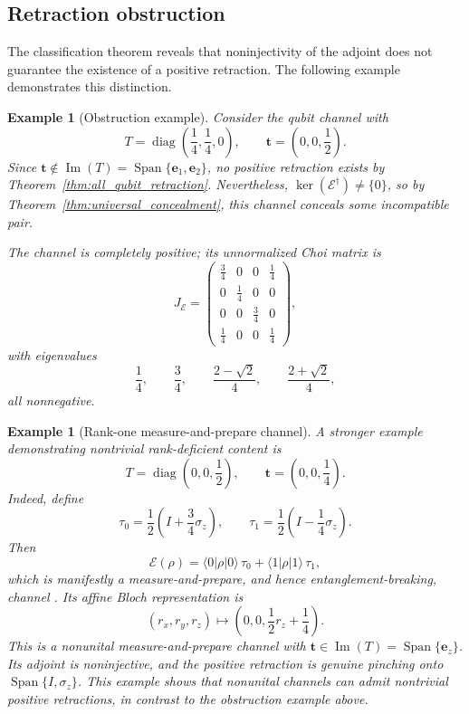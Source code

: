 \documentclass[
aps,pra,twocolumn,10pt,
superscriptaddress,longbibliography,floatfix
]{revtex4-2}
\DeclareMathOperator{\diag}{diag}
\DeclareMathOperator{\Span}{Span}
\DeclareMathOperator{\im}{Im}
\newtheorem{example}[theorem]{Example}
\begin{document}
\subsection{Retraction obstruction}

The classification theorem reveals that noninjectivity of the adjoint does not guarantee the existence of a positive retraction. The following example demonstrates this distinction.

\begin{example}[Obstruction example]
Consider the qubit channel with
\[
T=\diag\!\left(\frac14,\frac14,0\right),\qquad \mathbf t=\left(0,0,\frac12\right).
\]
Since $\mathbf t\notin\im(T)=\Span\{\mathbf e_1,\mathbf e_2\}$, no positive retraction exists by Theorem~\ref{thm:all_qubit_retraction}. Nevertheless, $\ker(\mathcal E^\dagger)\neq\{0\}$, so by Theorem~\ref{thm:universal_concealment}, this channel conceals some incompatible pair.

The channel is completely positive; its unnormalized Choi matrix is
\[
J_{\mathcal E}
=
\begin{pmatrix}
\frac34&0&0&\frac14\\
0&\frac14&0&0\\
0&0&\frac34&0\\
\frac14&0&0&\frac14
\end{pmatrix},
\]
with eigenvalues
\[
\frac14,\qquad
\frac34,\qquad
\frac{2-\sqrt2}{4},\qquad
\frac{2+\sqrt2}{4},
\]
all nonnegative.
\end{example}

\begin{example}[Rank-one measure-and-prepare channel]
A stronger example demonstrating nontrivial rank-deficient content is
\[
T=\diag\left(0,0,\frac12\right),\qquad \mathbf t=\left(0,0,\frac14\right).
\]
Indeed, define
\[
\tau_0=\frac12\left(I+\frac34\sigma_z\right),
\qquad
\tau_1=\frac12\left(I-\frac14\sigma_z\right).
\]
Then
\[
\mathcal E(\rho)
=
\langle0|\rho|0\rangle\,\tau_0
+
\langle1|\rho|1\rangle\,\tau_1,
\]
which is manifestly a measure-and-prepare, and hence entanglement-breaking, channel \cite{Horodecki2003}. Its affine Bloch representation is
\[
(r_x,r_y,r_z)
\longmapsto
\left(0,0,\frac12r_z+\frac14\right).
\]
This is a nonunital measure-and-prepare channel with $\mathbf t\in\im(T)=\Span\{\mathbf e_z\}$. Its adjoint is noninjective, and the positive retraction is genuine pinching onto $\Span\{I,\sigma_z\}$. This example shows that nonunital channels can admit nontrivial positive retractions, in contrast to the obstruction example above.
\end{example}
\end{document}
